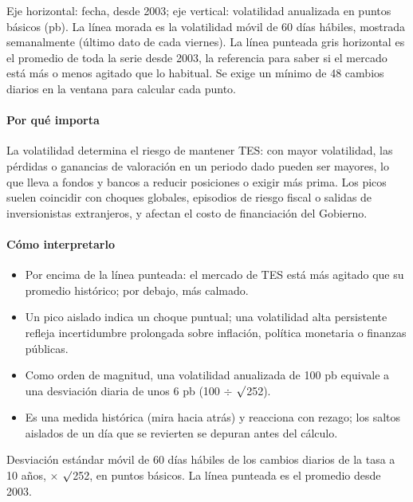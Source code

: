 \begin{leer}
Eje horizontal: fecha, desde 2003; eje vertical: volatilidad anualizada en puntos básicos (pb). La línea morada es la volatilidad móvil de 60 días hábiles, mostrada semanalmente (último dato de cada viernes). La línea punteada gris horizontal es el promedio de toda la serie desde 2003, la referencia para saber si el mercado está más o menos agitado que lo habitual. Se exige un mínimo de 48 cambios diarios en la ventana para calcular cada punto.
\end{leer}

\paragraph{Por qué importa}
La volatilidad determina el riesgo de mantener TES: con mayor volatilidad, las pérdidas o ganancias de valoración en un periodo dado pueden ser mayores, lo que lleva a fondos y bancos a reducir posiciones o exigir más prima. Los picos suelen coincidir con choques globales, episodios de riesgo fiscal o salidas de inversionistas extranjeros, y afectan el costo de financiación del Gobierno.

\paragraph{Cómo interpretarlo}
\begin{itemize}
\item Por encima de la línea punteada: el mercado de TES está más agitado que su promedio histórico; por debajo, más calmado.
\item Un pico aislado indica un choque puntual; una volatilidad alta persistente refleja incertidumbre prolongada sobre inflación, política monetaria o finanzas públicas.
\item Como orden de magnitud, una volatilidad anualizada de 100 pb equivale a una desviación diaria de unos 6 pb (100 $\div$ $\surd$252).
\item Es una medida histórica (mira hacia atrás) y reacciona con rezago; los saltos aislados de un día que se revierten se depuran antes del cálculo.
\end{itemize}
\begin{formulas}[Fórmulas]
\end{formulas}
\begin{metodo}[Metodología]
Desviación estándar móvil de 60 días hábiles de los cambios diarios de la tasa a 10 años, $\times$ $\surd$252, en puntos básicos. La línea punteada es el promedio desde 2003.
\par{}
\end{metodo}


